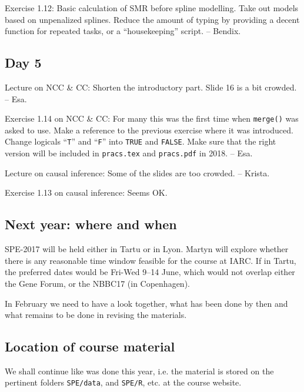 Exercise 1.12: Basic calculation of SMR before spline modelling.
Take out models based on unpenalized splines.
 Reduce the amount of typing by providing a decent function
for repeated tasks, or a ``housekeeping'' script. -- Bendix.  

\subsection*{Day 5}

Lecture on NCC \& CC: Shorten the introductory part. Slide 16 is a bit crowded. -- Esa. 

Exercise 1.14 on NCC \& CC: 
For many this was the first time when {\tt merge()} was asked to use. Make a reference to the previous exercise
where it was introduced.
Change logicals ``{\tt T}'' and ``{\tt F}'' into
{\tt TRUE} and {\tt FALSE}. 
Make sure that the right version will be included in {\tt pracs.tex} and {\tt pracs.pdf} in 2018. -- Esa.

Lecture on causal inference: Some of the slides are too crowded. -- Krista.

Exercise 1.13 on causal inference: Seems OK.



\subsection*{Next year: where and when}
SPE-2017 will be held either in Tartu or in Lyon. Martyn will explore whether there is any 
reasonable time window feasible for the course at IARC.
If in Tartu, the preferred dates would be Fri-Wed 9--14 June, 
which would not overlap either the Gene Forum, or the NBBC17 (in Copenhagen).

In February we need to have a look together, what has been done  by then
and what remains to be done in revising the materials.

\subsection*{Location of course material}
We shall continue like was done this year, i.e. the material is stored on the pertinent folders 
\texttt{SPE/data}, and \texttt{SPE/R}, etc. at the course website.

